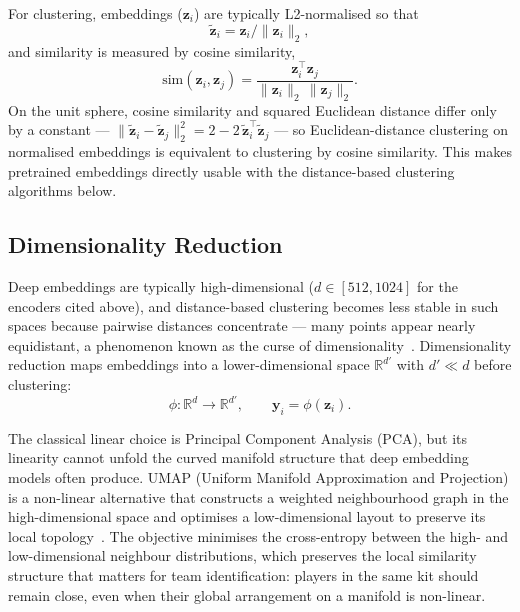 For clustering, embeddings ($\mathbf{z}_i$) are typically L2-normalised so 
that
\[
    \tilde{\mathbf{z}}_i = \mathbf{z}_i / \lVert \mathbf{z}_i \rVert_2,
\]
and similarity is measured by cosine similarity,
\[
    \mathrm{sim}(\mathbf{z}_i, \mathbf{z}_j) =
    \frac{\mathbf{z}_i^\top \mathbf{z}_j}
         {\lVert \mathbf{z}_i \rVert_2\, \lVert \mathbf{z}_j \rVert_2}.
\]
On the unit sphere, cosine similarity and squared Euclidean 
distance differ only by a constant — 
\(\lVert \tilde{\mathbf{z}}_i - \tilde{\mathbf{z}}_j \rVert_2^2 
= 2 - 2\,\tilde{\mathbf{z}}_i^\top \tilde{\mathbf{z}}_j\) — 
so Euclidean-distance clustering on normalised embeddings 
is equivalent to clustering by cosine similarity. This 
makes pretrained embeddings directly usable with the 
distance-based clustering algorithms below.

\subsection{Dimensionality Reduction}
\label{subsec:team_id_dimred}

Deep embeddings are typically high-dimensional 
(\(d \in [512, 1024]\) for the encoders cited above), and 
distance-based clustering becomes less stable in such 
spaces because pairwise distances concentrate — many points 
appear nearly equidistant, a phenomenon known as the curse 
of dimensionality~\cite{aggarwal2001surprising}. 
Dimensionality reduction maps embeddings into a 
lower-dimensional space \(\mathbb{R}^{d'}\) with 
\(d' \ll d\) before clustering:
\begin{equation}
    \phi : \mathbb{R}^{d} \rightarrow \mathbb{R}^{d'},
    \qquad
    \mathbf{y}_i = \phi(\mathbf{z}_i).
    \label{eq:team_dimred}
\end{equation}

The classical linear choice is Principal Component Analysis 
(PCA), but its linearity cannot unfold the curved manifold 
structure that deep embedding models often produce. UMAP 
(Uniform Manifold Approximation and Projection) is a 
non-linear alternative that constructs a weighted 
neighbourhood graph in the high-dimensional space and 
optimises a low-dimensional layout to preserve its local 
topology~\cite{McInnes2018}. The objective minimises the 
cross-entropy between the high- and low-dimensional 
neighbour distributions, which preserves the local 
similarity structure that matters for team identification: 
players in the same kit should remain close, even when 
their global arrangement on a manifold is non-linear.

